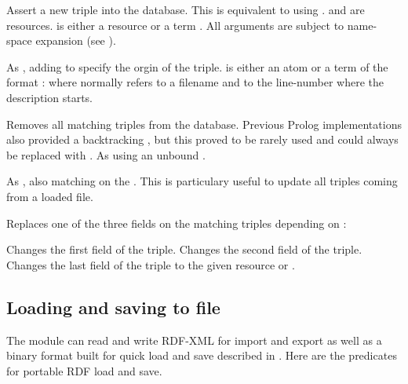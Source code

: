 \documentclass[11pt]{article}
\begin{document}
\begin{description}
Assert a new triple into the database. This is equivalent to
 using  .  and
 are resources.  is either a resource or a
term . All arguments are subject to name-space
expansion (see ).

As , adding  to specify the orgin of the
triple.   is either an atom or a term of the format
: where  normally refers to a filename
and  to the line-number where the description starts.

Removes all matching triples from the database.  Previous Prolog
implementations also provided a backtracking ,
but this proved to be rarely used and could always be replaced with
. As  using an unbound .

As , also matching on the .  This is
particulary useful to update all triples coming from a loaded file.

Replaces one of the three fields on the matching triples depending
on :

\begin{description}
Changes the first field of the triple.
Changes the second field of the triple.
Changes the last field of the triple to the given resource or
.
\end{description}
\end{description}


\subsection{Loading and saving to file}		\label{sec:rdffile}

The  module can read and write RDF-XML for import and
export as well as a binary format built for quick load and save
described in .  Here are the predicates
for portable RDF load and save.
\end{document}
